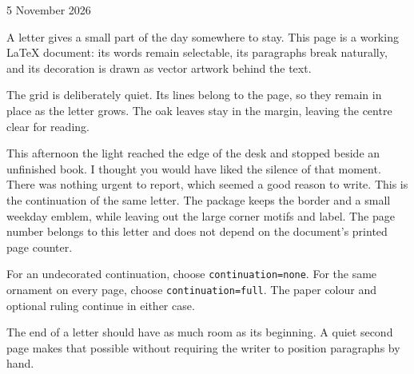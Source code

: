 \documentclass[a4paper]{seasonalletter}
\begin{document}
\begin{SeasonalLetter}
\hfill 5 November 2026\par
{}
A letter gives a small part of the day somewhere to stay. This page is a working
LaTeX document: its words remain selectable, its paragraphs break naturally,
and its decoration is drawn as vector artwork behind the text.

The grid is deliberately quiet. Its lines belong to the page, so they remain
in place as the letter grows. The oak leaves stay in the margin, leaving the
centre clear for reading.

This afternoon the light reached the edge of the desk and stopped beside an
unfinished book. I thought you would have liked the silence of that moment.
There was nothing urgent to report, which seemed a good reason to write.
\newpage
{}
This is the continuation of the same letter. The package keeps the border and
a small weekday emblem, while leaving out the large corner motifs and label.
The page number belongs to this letter and does not depend on the document's
printed page counter.

For an undecorated continuation, choose \texttt{continuation=none}. For the
same ornament on every page, choose \texttt{continuation=full}. The paper
colour and optional ruling continue in either case.

The end of a letter should have as much room as its beginning. A quiet second
page makes that possible without requiring the writer to position paragraphs
by hand.
\end{SeasonalLetter}
\end{document}
